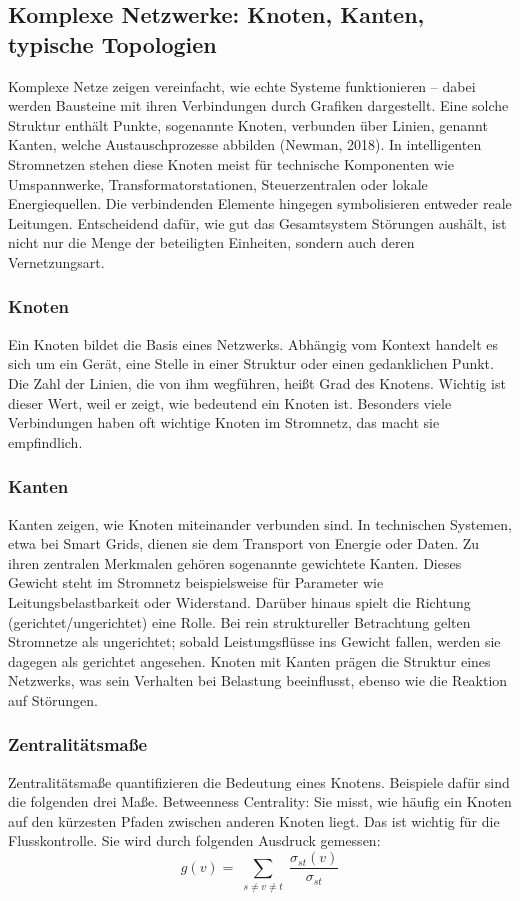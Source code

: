 \subsection{Komplexe Netzwerke: Knoten, Kanten, typische Topologien}
Komplexe Netze zeigen vereinfacht, wie echte Systeme funktionieren – dabei werden Bausteine mit ihren Verbindungen durch Grafiken dargestellt. Eine solche Struktur enthält Punkte, sogenannte Knoten, verbunden über Linien, genannt Kanten, welche Austauschprozesse abbilden (Newman, 2018). In intelligenten Stromnetzen stehen diese Knoten meist für technische Komponenten wie Umspannwerke, Transformatorstationen, Steuerzentralen oder lokale Energiequellen. Die verbindenden Elemente hingegen symbolisieren entweder reale Leitungen. Entscheidend dafür, wie gut das Gesamtsystem Störungen aushält, ist nicht nur die Menge der beteiligten Einheiten, sondern auch deren Vernetzungsart.
\subsubsection{Knoten}
Ein Knoten bildet die Basis eines Netzwerks. Abhängig vom Kontext handelt es sich um ein Gerät, eine Stelle in einer Struktur oder einen gedanklichen Punkt. Die Zahl der Linien, die von ihm wegführen, heißt Grad des Knotens. Wichtig ist dieser Wert, weil er zeigt, wie bedeutend ein Knoten ist. Besonders viele Verbindungen haben oft wichtige Knoten im Stromnetz, das macht sie empfindlich.
\subsubsection{Kanten} 
Kanten zeigen, wie Knoten miteinander verbunden sind. In technischen Systemen, etwa bei Smart Grids, dienen sie dem Transport von Energie oder Daten. Zu ihren zentralen Merkmalen gehören sogenannte gewichtete Kanten. Dieses Gewicht steht im Stromnetz beispielsweise für Parameter wie Leitungsbelastbarkeit oder Widerstand. Darüber hinaus spielt die Richtung (gerichtet/ungerichtet) eine Rolle. Bei rein struktureller Betrachtung gelten Stromnetze als ungerichtet; sobald Leistungsflüsse ins Gewicht fallen, werden sie dagegen als gerichtet angesehen.
Knoten mit Kanten prägen die Struktur eines Netzwerks, was sein Verhalten bei Belastung beeinflusst, ebenso wie die Reaktion auf Störungen.
\subsubsection{Zentralitätsmaße}
Zentralitätsmaße quantifizieren die Bedeutung eines Knotens. Beispiele dafür sind die folgenden drei Maße.
	Betweenness Centrality: Sie misst, wie häufig ein Knoten auf den kürzesten Pfaden zwischen anderen Knoten liegt. Das ist wichtig für die Flusskontrolle. Sie wird durch folgenden Ausdruck gemessen:
\[
g(v) = \sum_{\substack{s \neq v \neq t}} \frac{\sigma_{st}(v)}{\sigma_{st}}
\]

